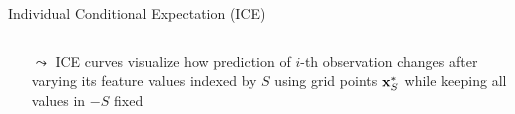 \documentclass[10pt,compress,t,notes=noshow, xcolor=table]{beamer}
\begin{document}
\begin{frame}[c]{Individual Conditional Expectation (ICE) }
\begin{columns}[T, totalwidth=\textwidth]
\begin{column}{0.84\textwidth}
\medskip

\begin{itemize}
    \item[$\leadsto$] ICE curves visualize how prediction of $i$-th observation changes after varying its feature values indexed by $S$ using grid points $\mathbf{x}_S^*$ while keeping all values in $-S$ fixed

\end{itemize}



\end{column}
\end{columns}



%
\end{frame}
\end{document}
